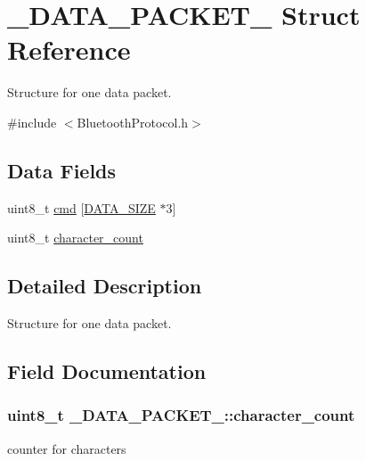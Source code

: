 \hypertarget{struct___d_a_t_a___p_a_c_k_e_t__}{}\section{\+\_\+\+D\+A\+T\+A\+\_\+\+P\+A\+C\+K\+E\+T\+\_\+ Struct Reference}
\label{struct___d_a_t_a___p_a_c_k_e_t__}


Structure for one data packet.  




{\ttfamily \#include $<$Bluetooth\+Protocol.\+h$>$}

\subsection*{Data Fields}
\begin{DoxyCompactItemize}
\item 
uint8\+\_\+t \hyperlink{struct___d_a_t_a___p_a_c_k_e_t___aa49ae45ff84ed4ccde15cb0a69ae679f}{cmd} \mbox{[}\hyperlink{_bluetooth_protocol_8h_af55149bc1f05cf18af067a302e31e3f9}{D\+A\+T\+A\+\_\+\+S\+I\+ZE} $\ast$3\mbox{]}
\item 
uint8\+\_\+t \hyperlink{struct___d_a_t_a___p_a_c_k_e_t___a8ac4ae9237e643e7da997113d49c452a}{character\+\_\+count}
\end{DoxyCompactItemize}


\subsection{Detailed Description}
Structure for one data packet. 

\subsection{Field Documentation}
\subsubsection[{\texorpdfstring{character\+\_\+count}{character_count}}]{\setlength{\rightskip}{0pt plus 5cm}uint8\+\_\+t \+\_\+\+D\+A\+T\+A\+\_\+\+P\+A\+C\+K\+E\+T\+\_\+\+::character\+\_\+count}\hypertarget{struct___d_a_t_a___p_a_c_k_e_t___a8ac4ae9237e643e7da997113d49c452a}{}\label{struct___d_a_t_a___p_a_c_k_e_t___a8ac4ae9237e643e7da997113d49c452a}
counter for characters 
